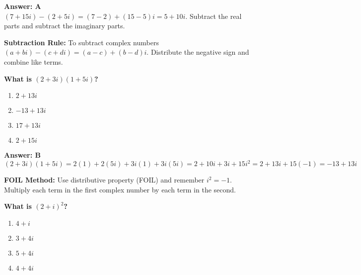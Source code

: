\documentclass[12pt,a4paper]{article}
\begin{document}
\begin{answerstyle}
\textbf{Answer: A} \\
\( (7 + 15i) - (2 + 5i) = (7 - 2) + (15 - 5)i = 5 + 10i \). Subtract the real parts and subtract the imaginary parts.
\end{answerstyle}

\begin{conceptbox}
\textbf{Subtraction Rule:} To subtract complex numbers \( (a + bi) - (c + di) = (a - c) + (b - d)i \). Distribute the negative sign and combine like terms.
\end{conceptbox}

\newpage
\begin{questiontitle}[MCQ 38]
\textbf{What is \( (2 + 3i)(1 + 5i) \)?}
\end{questiontitle}

\begin{partbox}[Options]
\begin{enumerate}[label=\Alph*.]
    \item \( 2 + 13i \)
    \item \( -13 + 13i \)
    \item \( 17 + 13i \)
    \item \( 2 + 15i \)
\end{enumerate}
\end{partbox}

\begin{answerstyle}
\textbf{Answer: B} \\
\( (2 + 3i)(1 + 5i) = 2(1) + 2(5i) + 3i(1) + 3i(5i) = 2 + 10i + 3i + 15i^2 = 2 + 13i + 15(-1) = -13 + 13i \)
\end{answerstyle}

\begin{conceptbox}
\textbf{FOIL Method:} Use distributive property (FOIL) and remember \( i^2 = -1 \). Multiply each term in the first complex number by each term in the second.
\end{conceptbox}

\newpage
\begin{questiontitle}[MCQ 39]
\textbf{What is \( (2 + i)^2 \)?}
\end{questiontitle}

\begin{partbox}[Options]
\begin{enumerate}[label=\Alph*.]
    \item \( 4 + i \)
    \item \( 3 + 4i \)
    \item \( 5 + 4i \)
    \item \( 4 + 4i \)
\end{enumerate}
\end{partbox}
\end{document}
